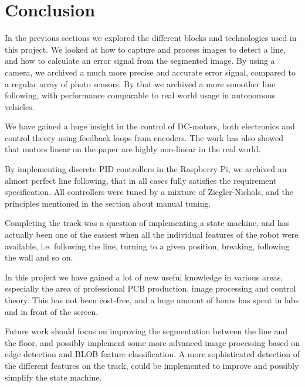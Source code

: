 \chapter{Conclusion}
\label{ch:conclusion}

In the previous sections we explored the different blocks and technologies used in this project. We looked at how to capture and process images to detect a line, and how to calculate an error signal from the segmented image. By using a camera, we archived a much more precise and accurate error signal, compared to a regular array of photo sensors. By that we archived a more smoother line following, with performance comparable to real world usage in autonomous vehicles.

We have gained a huge insight in the control of DC-motors, both electronics and control theory using feedback loops from encoders. The work has also showed that motors linear on the paper are highly non-linear in the real world.

By implementing discrete PID controllers in the Raspberry Pi, we archived an almost perfect line following, that in all cases fully satisfies the requirement specification. All controllers were tuned by a mixture of Ziegler-Nichols, and the principles mentioned in the section about manual tuning. 

Completing the track was a question of implementing a state machine, and has actually been one of the easiest when all the individual features of the robot were available, i.e. following the line, turning to a given position, breaking, following the wall and so on.

In this project we have gained a lot of new useful knowledge in various areas, especially the area of professional PCB production, image processing and control theory. This has not been cost-free, and a huge amount of hours has spent in labs and in front of the screen.

Future work should focus on improving the segmentation between the line and the floor, and possibly implement some more advanced image processing based on edge detection and BLOB feature classification. A more sophisticated detection of the different features on the track, could be implemented to improve and possibly simplify the state machine. 